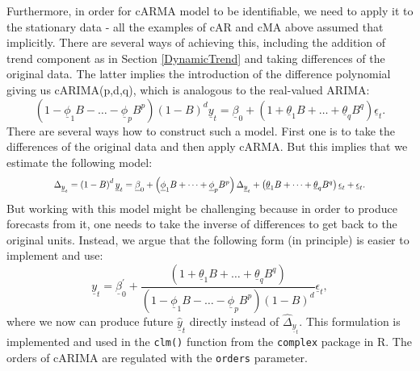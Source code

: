 \documentclass[
]{book}
\begin{document}
Furthermore, in order for cARMA model to be identifiable, we need to apply it to the stationary data - all the examples of cAR and cMA above assumed that implicitly. There are several ways of achieving this, including the addition of trend component as in Section \ref{DynamicTrend} and taking differences of the original data. The latter implies the introduction of the difference polynomial giving us cARIMA(p,d,q), which is analogous to the real-valued ARIMA:
\begin{equation}
    \left(1 - \underline{\phi}_1 B - \dots - \underline{\phi}_p B^p \right) \left(1 - B \right)^d \underline{y}_t  = \underline{\beta}_0 + \left(1 + \underline{\theta}_1 B + \dots + \underline{\theta}_q B^q \right) \underline{\epsilon}_t .
    \label{eq:ComplexARIMAPolynomial}
\end{equation}
There are several ways how to construct such a model. First one is to take the differences of the original data and then apply cARMA. But this implies that we estimate the following model:
\begin{equation}
    \resizebox{0.8\textwidth}{!}{$
    \Delta_{\underline{y}_t} = \left(1 - B \right)^d \underline{y}_t  = \underline{\beta}_0 + \left(\underline{\phi}_1 B + \dots + \underline{\phi}_p B^p \right) \Delta_{\underline{y}_t} + \left(\underline{\theta}_1 B + \dots + \underline{\theta}_q B^q \right) \underline{\epsilon}_t + \underline{\epsilon}_t .$}
    \label{eq:ComplexARIMADiffs}
\end{equation}
But working with this model might be challenging because in order to produce forecasts from it, one needs to take the inverse of differences to get back to the original units. Instead, we argue that the following form (in principle) is easier to implement and use:
\begin{equation}
    \underline{y}_t  = \underline{\beta}_0^\prime + \frac{\left(1 + \underline{\theta}_1 B + \dots + \underline{\theta}_q B^q \right)}{\left(1 - \underline{\phi}_1 B - \dots - \underline{\phi}_p B^p \right) \left(1 - B \right)^d} \underline{\epsilon}_t ,
    \label{eq:ComplexARIMADiffsCorrect}
\end{equation}
where we now can produce future \(\hat{\underline{y}}_t\) directly instead of \(\hat{\Delta}_{\underline{y}_t}\). This formulation is implemented and used in the \texttt{clm()} function from the \texttt{complex} package in R. The orders of cARIMA are regulated with the \texttt{orders} parameter.
\end{document}
